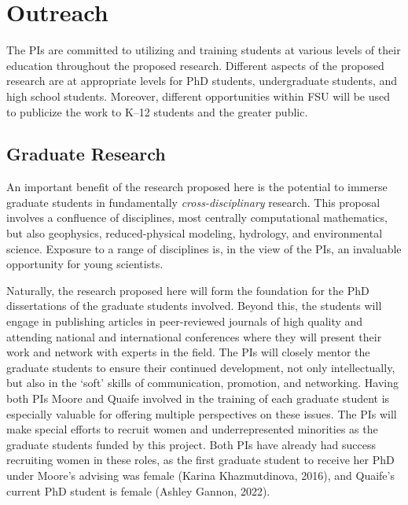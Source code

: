 \documentclass[11pt]{article}
\begin{document}
\section{Outreach}
The PIs are committed to utilizing and training students at various levels of their education throughout the proposed research. Different aspects of the proposed research are at appropriate levels for PhD students, undergraduate students, and high school students. Moreover, different opportunities within FSU will be used to publicize the work to K--12 students and the greater public.

\subsection{Graduate Research}
An important benefit of the research proposed here is the potential to immerse graduate students in fundamentally {\em cross-disciplinary} research. This proposal involves a confluence of disciplines, most centrally computational mathematics, but also geophysics, reduced-physical modeling, hydrology, and environmental science.  Exposure to a range of disciplines is, in the view of the PIs, an invaluable opportunity for young scientists.

Naturally, the research proposed here will form the foundation for the
PhD dissertations of the graduate students involved. Beyond this, the
students will engage in publishing articles in peer-reviewed journals of
high quality and attending national and international conferences where
they will present their work and network with experts in the field. The
PIs will closely mentor the graduate students to ensure their continued
development, not only intellectually, but also in the `soft' skills of
communication, promotion, and networking. Having both PIs Moore and
Quaife involved in the training of each graduate student is especially
valuable for offering multiple perspectives on these issues. The PIs
will make special efforts to recruit women and underrepresented
minorities as the graduate students funded by this project. Both PIs
have already had success recruiting women in these roles, as the first
graduate student to receive her PhD under Moore's advising was female
(Karina Khazmutdinova, 2016), and Quaife's current PhD student is female
(Ashley Gannon, 2022).
\end{document}
